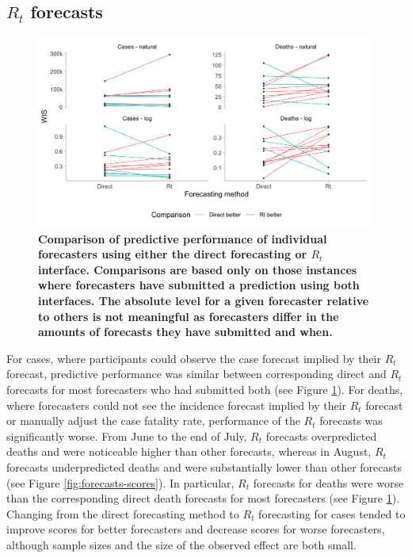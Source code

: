 \documentclass[10pt,a4paper,twocolumn]{article}
\begin{document}
\subsection*{$R_t$ forecasts}

\begin{figure}
\centering
\includegraphics[width=0.99\textwidth]{../output/figures/comparison-direct-rt-individual.png}
\caption{\bf{Comparison of predictive performance of individual forecasters using either the direct forecasting or $R_t$ interface}. Comparisons are based only on those instances where forecasters have submitted a prediction using both interfaces. The absolute level for a given forecaster relative to others is not meaningful as forecasters differ in the amounts of forecasts they have submitted and when.}
\label{fig:comparison-direct-rt-individual}
\end{figure}
For cases, where participants could observe the case forecast implied by their $R_t$ forecast, predictive performance was similar between corresponding direct and $R_t$ forecasts for most forecasters who had submitted both (see Figure \ref{fig:comparison-direct-rt-individual}). For deaths, where forecasters could not see the incidence forecast implied by their $R_t$ forecast or manually adjust the case fatality rate, performance of the $R_t$ forecasts was significantly worse. From June to the end of July, $R_t$ forecasts overpredicted deaths and were noticeable higher than other forecasts, whereas in August, $R_t$ forecasts underpredicted deaths and were substantially lower than other forecasts (see Figure \ref{fig:forecasts-scores}). In particular, $R_t$ forecasts for deaths were worse than the corresponding direct death forecasts for most forecasters (see Figure \ref{fig:comparison-direct-rt-individual}). Changing from the direct forecasting method to $R_t$ forecasting for cases tended to improve scores for better forecasters and decrease scores for worse forecasters, although sample sizes and the size of the observed effect are both small. 
\end{document}
